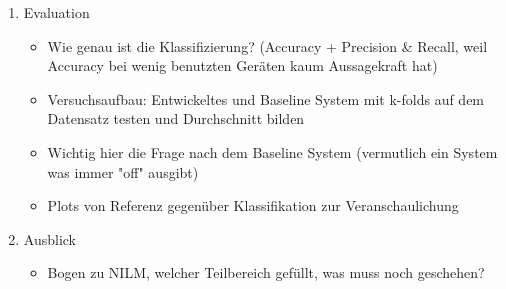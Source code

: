\documentclass[10pt, a4paper]{report}
\begin{document}
\begin{enumerate}
	\item Evaluation
	\begin{itemize}
		\item Wie genau ist die Klassifizierung? (Accuracy + Precision \& Recall, weil Accuracy bei wenig benutzten Geräten kaum Aussagekraft hat)
		\item Versuchsaufbau: Entwickeltes und Baseline System mit k-folds auf dem Datensatz testen und Durchschnitt bilden
		\item Wichtig hier die Frage nach dem Baseline System (vermutlich ein System was immer "off" ausgibt) 
		\item Plots von Referenz gegenüber Klassifikation zur Veranschaulichung
	\end{itemize}
	
	\item Ausblick
	\begin{itemize}
		\item Bogen zu NILM, welcher Teilbereich gefüllt, was muss noch geschehen?
	\end{itemize}
\end{enumerate}
\end{document}
